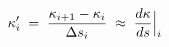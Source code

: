 \documentclass[preview]{standalone}
\begin{document}
\begin{align*}
\special{dvisvgm:raw <g id='unique000'>}\kappa'_i \;=\; \dfrac{\kappa_{i+1} - \kappa_i}{\Delta s_i} \;\approx\; \dfrac{d\kappa}{ds}\Big|_i\special{dvisvgm:raw </g>}
\end{align*}
\end{document}
